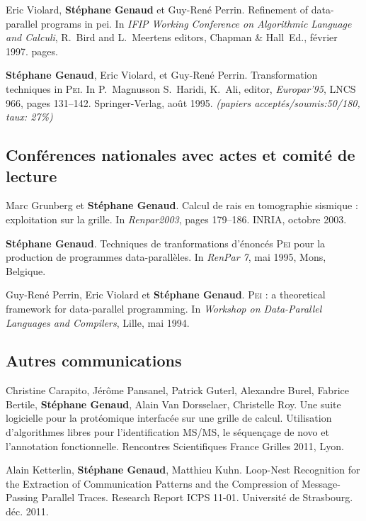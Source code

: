 \documentclass[11pt]{article}
\begin{document}
\begin{thebibliography}{99}
Eric Violard, \textbf{Stéphane Genaud} et Guy-René Perrin.
\newblock Refinement of data-parallel programs in pei.
\newblock In {\em IFIP Working Conference on Algorithmic Language and Calculi}, 
R.~Bird and L.~Meertens editors, Chapman \& Hall~Ed., février 1997.
 pages.

\textbf{Stéphane Genaud}, Eric Violard, et Guy-René Perrin.
\newblock Transformation techniques in \textsc{Pei}.
\newblock In P.~Magnusson S.~Haridi, K.~Ali, editor, {\em Europar'95}, LNCS
  966, pages 131--142. Springer-Verlag, août 1995.
\newblock \small{\textit{(papiers acceptés/soumis:50/180, taux: 27\%)}}




\subsection*{Conférences nationales avec actes et comité de lecture}
Marc Grunberg et \textbf{Stéphane Genaud}.
\newblock Calcul de rais en tomographie sismique : exploitation sur la grille.
\newblock In {\em Renpar2003}, pages 179--186. INRIA, octobre 2003.

\textbf{Stéphane Genaud}.
\newblock Techniques de tranformations d'énoncés \textsc{Pei} pour la
  production de programmes data-parallèles.
\newblock In {\em RenPar 7}, mai 1995, Mons, Belgique.

Guy-René Perrin, Eric Violard et \textbf{Stéphane Genaud}.
\newblock \textsc{Pei} : a theoretical framework for data-parallel programming.
\newblock In {\em Workshop on Data-Parallel Languages and Compilers}, Lille, 
mai 1994.
\vspace{3mm}


\subsection*{Autres communications}

Christine Carapito, Jérôme Pansanel, Patrick Guterl, Alexandre Burel, Fabrice 
Bertile, \textbf{Stéphane Genaud}, Alain Van Dorsselaer, Christelle Roy.
\newblock Une suite logicielle pour la protéomique interfacée sur une grille de 
calcul. Utilisation d'algorithmes libres pour l'identification MS/MS, le 
séquençage de novo et l'annotation fonctionnelle.
\newblock Rencontres Scientifiques France Grilles 2011, Lyon.


Alain Ketterlin, \textbf{Stéphane Genaud}, Matthieu Kuhn.
\newblock Loop-Nest Recognition for the Extraction of Communication Patterns 
and the Compression of Message-Passing Parallel Traces.
\newblock Research Report ICPS 11-01. Université de Strasbourg. déc. 2011.



\end{thebibliography}
\end{document}
